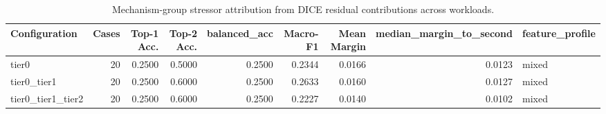 \begin{table}[t]
\centering
\caption{Mechanism-group stressor attribution from DICE residual contributions across workloads.}
\label{tab:dice_stressor_diagnosis}
\footnotesize
\begin{tabular}{lrrrrrrrl}
\toprule
Configuration & Cases & Top-1 Acc. & Top-2 Acc. & balanced_acc & Macro-F1 & Mean Margin & median_margin_to_second & feature_profile \\
\midrule
tier0 & 20 & 0.2500 & 0.5000 & 0.2500 & 0.2344 & 0.0166 & 0.0123 & mixed \\
tier0_tier1 & 20 & 0.2500 & 0.6000 & 0.2500 & 0.2633 & 0.0160 & 0.0127 & mixed \\
tier0_tier1_tier2 & 20 & 0.2500 & 0.6000 & 0.2500 & 0.2227 & 0.0140 & 0.0102 & mixed \\
\bottomrule
\end{tabular}

\end{table}
